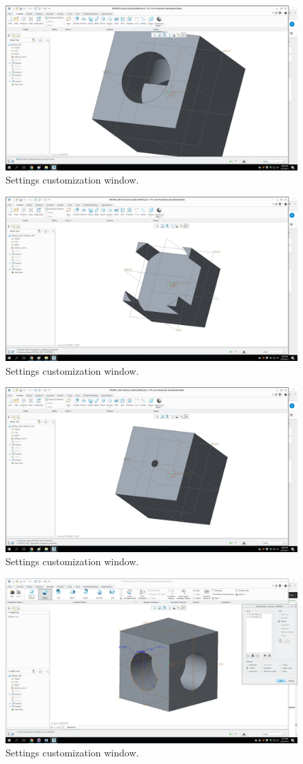 \begin{figure}[ht!]
\centering
  \includegraphics[width=0.7\linewidth]{CAD/Technique/FamilyTableFolder/Capture_1.png}
  \caption{Settings customization window.}
  \label{fig:Dim_Exa_1}
\end{figure}

\begin{figure}[ht!]
\centering
  \includegraphics[width=0.7\linewidth]{CAD/Technique/FamilyTableFolder/Capture_2.png}
  \caption{Settings customization window.}
  \label{fig:Dim_Exa_2}
\end{figure}

\begin{figure}[ht!]
\centering
  \includegraphics[width=0.7\linewidth]{CAD/Technique/FamilyTableFolder/Capture_3.png}
  \caption{Settings customization window.}
  \label{fig:Dim_Exa_3}
\end{figure}

\begin{figure}[ht!]
\centering
  \includegraphics[width=0.7\linewidth]{CAD/Technique/FamilyTableFolder/Capture11.png}
  \caption{Settings customization window.}
  \label{fig:Mod_Ins_1}
\end{figure}

